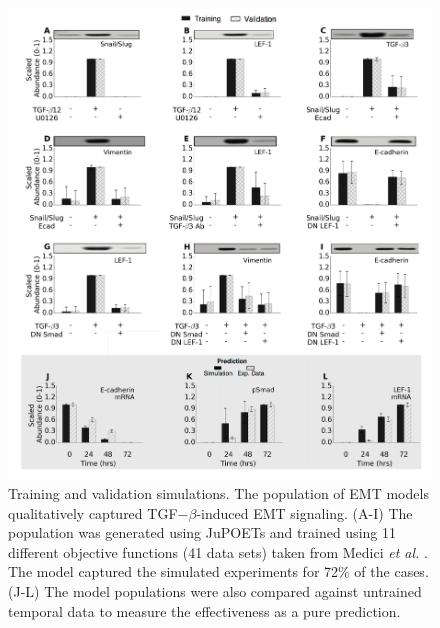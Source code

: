 \documentclass[12pt]{article}
\begin{document}
\begin{figure}
\includegraphics [width=1.0\linewidth] {./figs/Fig2_training.pdf}
\caption{Training and validation simulations. The population of EMT models qualitatively captured TGF$-\beta$-induced EMT signaling.
(A-I) The population was generated using JuPOETs and trained using 11 different objective functions (41 data sets) taken from Medici \emph{et al.} \citep{Medici:2008fk}.
The model captured the simulated experiments for 72\% of the cases.
(J-L)  The model populations were also compared against untrained temporal data to measure the effectiveness as a pure prediction.}\label{fg:F2}
\end{figure}

\clearpage
\end{document}
